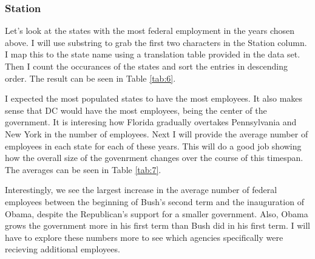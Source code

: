 \documentclass{article}
\begin{document}
        \subsubsection{Station}
        Let's look at the states with the most federal employment in the years chosen above. I will use substring to grab the first two characters in the Station column. I map this to the state name using a translation table provided in the data set. Then I count the occurances of the states and sort the entries in descending order. The result can be seen in Table \ref{tab:6}.
        \par
        I expected the most populated states to have the most employees. It also makes sense that DC would have the most employees, being the center of the government. It is interesing how Florida gradually overtakes Pennsylvania and New York in the number of employees. Next I will provide the average number of employees in each state for each of these years. This will do a good job showing how the overall size of the govenrment changes over the course of this timespan. The averages can be seen in Table \ref{tab:7}.
        \par
        Interestingly, we see the largest increase in the average number of federal employees between the beginning of Bush's second term and the inauguration of Obama, despite the Republican's support for a smaller government. Also, Obama grows the government more in his first term than Bush did in his first term. I will have to explore these numbers more to see which agencies specifically were recieving additional employees.
\end{document}
